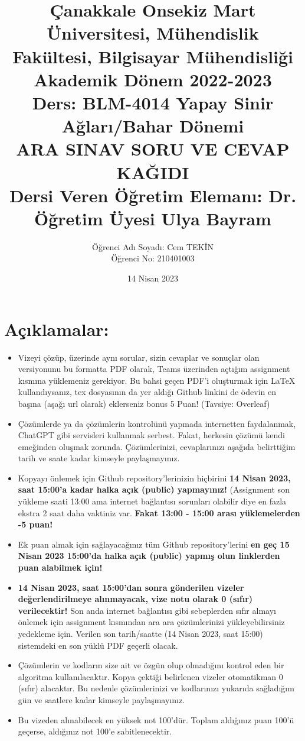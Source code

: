 \documentclass[11pt]{article}
\title{Çanakkale Onsekiz Mart Üniversitesi, Mühendislik Fakültesi, Bilgisayar Mühendisliği Akademik Dönem 2022-2023\\
Ders: BLM-4014 Yapay Sinir Ağları/Bahar Dönemi\\ 
ARA SINAV SORU VE CEVAP KAĞIDI \\
Dersi Veren Öğretim Elemanı: Dr. Öğretim Üyesi Ulya Bayram}
\author{%
\begin{minipage}{\textwidth}
\raggedright
Öğrenci Adı Soyadı: Cem TEKİN \\ %
Öğrenci No: 210401003
\end{minipage}%
}
\date{14 Nisan 2023}
\begin{document}
\maketitle

\vspace{-.5in}
\section*{Açıklamalar:}
\begin{itemize}
    \item Vizeyi çözüp, üzerinde aynı sorular, sizin cevaplar ve sonuçlar olan versiyonunu bu formatta PDF olarak, Teams üzerinden açtığım assignment kısmına yüklemeniz gerekiyor. Bu bahsi geçen PDF'i oluşturmak için LaTeX kullandıysanız, tex dosyasının da yer aldığı Github linkini de ödevin en başına (aşağı url olarak) eklerseniz bonus 5 Puan! (Tavsiye: Overleaf)
    \item Çözümlerde ya da çözümlerin kontrolünü yapmada internetten faydalanmak, ChatGPT gibi servisleri kullanmak serbest. Fakat, herkesin çözümü kendi emeğinden oluşmak zorunda. Çözümlerinizi, cevaplarınızı aşağıda belirttiğim tarih ve saate kadar kimseyle paylaşmayınız. 
    \item Kopyayı önlemek için Github repository'lerinizin hiçbirini \textbf{14 Nisan 2023, saat 15:00'a kadar halka açık (public) yapmayınız!} (Assignment son yükleme saati 13:00 ama internet bağlantısı sorunları olabilir diye en fazla ekstra 2 saat daha vaktiniz var. \textbf{Fakat 13:00 - 15:00 arası yüklemelerden -5 puan!}
    \item Ek puan almak için sağlayacağınız tüm Github repository'lerini \textbf{en geç 15 Nisan 2023 15:00'da halka açık (public) yapmış olun linklerden puan alabilmek için!}
    \item \textbf{14 Nisan 2023, saat 15:00'dan sonra gönderilen vizeler değerlendirilmeye alınmayacak, vize notu olarak 0 (sıfır) verilecektir!} Son anda internet bağlantısı gibi sebeplerden sıfır almayı önlemek için assignment kısmından ara ara çözümlerinizi yükleyebilirsiniz yedekleme için. Verilen son tarih/saatte (14 Nisan 2023, saat 15:00) sistemdeki en son yüklü PDF geçerli olacak.
    \item Çözümlerin ve kodların size ait ve özgün olup olmadığını kontrol eden bir algoritma kullanılacaktır. Kopya çektiği belirlenen vizeler otomatikman 0 (sıfır) alacaktır. Bu nedenle çözümlerinizi ve kodlarınızı yukarıda sağladığım gün ve saatlere kadar kimseyle paylaşmayınız.
    \item Bu vizeden alınabilecek en yüksek not 100'dür. Toplam aldığınız puan 100'ü geçerse, aldığınız not 100'e sabitlenecektir.

\end{itemize}
\end{document}

